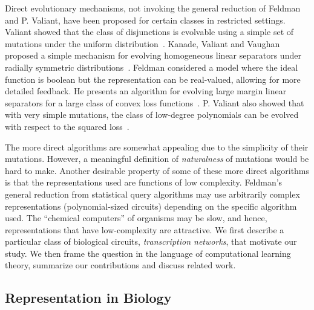 Direct evolutionary mechanisms, not invoking the general reduction of Feldman
and P. Valiant, have been proposed for certain classes in restricted settings.
Valiant showed that the class of disjunctions is evolvable using a simple set of
mutations under the uniform distribution~\cite{Valiant:2009-evolvability}.
Kanade, Valiant and Vaughan proposed a simple mechanism for evolving homogeneous
linear separators under radially symmetric distributions~\cite{KVV:2010-drift}.
Feldman considered a model where the ideal function is boolean but the
representation can be real-valued, allowing for more detailed feedback. He
presents an algorithm for evolving large margin linear separators for a large
class of convex loss functions~\cite{Feldman:2011-LTF}. P. Valiant also showed
that with very simple mutations, the class of low-degree polynomials can be
evolved with respect to the squared loss~\cite{Valiant:2012-real}.

The more direct algorithms are somewhat appealing due to the simplicity of their
mutations.  However, a meaningful definition of \emph{naturalness} of mutations
would be hard to make.
Another desirable property of some of these more direct algorithms is that the
representations used are functions of low complexity. Feldman's general
reduction from statistical query algorithms may use arbitrarily complex
representations (polynomial-sized circuits) depending on the specific algorithm
used. The ``chemical computers'' of organisms may be slow, and hence,
representations that have low-complexity are attractive. We first describe a
particular class of biological circuits, \emph{transcription networks}, that
motivate our study. We then frame the question in the language of computational
learning theory, summarize our contributions and discuss related work.

\subsection{Representation in Biology}

